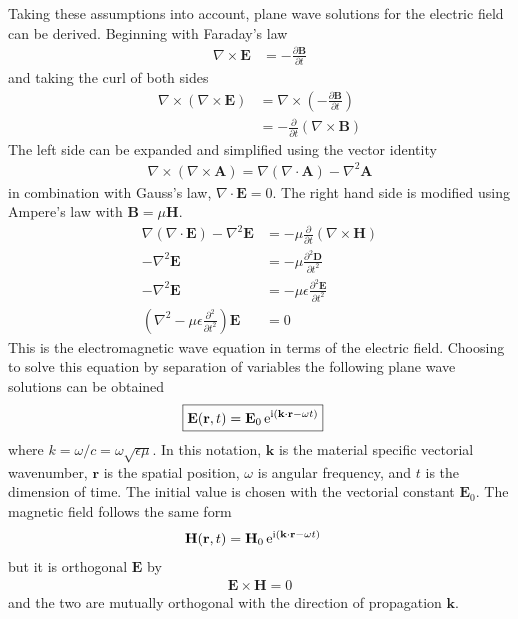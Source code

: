 Taking these assumptions into account, plane wave solutions for the
electric field can be derived. Beginning with Faraday's law
\begin{align}
\nabla \times \mathbf{E} &= -\frac{\partial \mathbf{B}} {\partial t}
\end{align}
and taking the curl of both sides
\begin{align}
\nabla \times
\left(\nabla\times\mathbf{E}\right)&=\nabla\times\left(-\frac{\partial\mathbf{B}}{\partial
t}\right)\\
&=-\frac{\partial}{\partial t}\left(\nabla \times \mathbf{B}\right)
\end{align}
The left side can be expanded and simplified using the vector identity
\begin{align}
\nabla \times \left( \nabla \times \mathbf{A} \right) = \nabla \left(
\nabla \cdot \mathbf{A} \right) - \nabla^2 \mathbf{A}
\end{align}
in combination with Gauss's law, $\nabla \cdot \mathbf{E}=0$.
The right hand side is modified using Ampere's law with $\mathbf{B} =\mu
\mathbf{H}$.
\begin{align}
\nabla\left(\nabla\cdot\mathbf{E}\right)-\nabla^2\mathbf{E}
&=-\mu\frac{\partial}{\partial t}\left(\nabla \times \mathbf{H}\right)\\
-\nabla^2\mathbf{E}&=-\mu\frac{\partial^2 \mathbf{D}}{\partial t^2}\\
-\nabla^2\mathbf{E}&=-\mu\epsilon\frac{\partial^2 \mathbf{E}}{\partial t^2}\\
\left(\nabla^2-\mu\epsilon\frac{\partial^2}{\partial t^2}\right)\mathbf{E}&=0
\label{eqn:ewe}
\end{align}
This is the electromagnetic wave equation in terms of the electric field.
Choosing to solve this equation by separation of variables the following
plane wave solutions can be obtained
\begin{align}
\Aboxed{
 \mathbf{E} ( \mathbf{r}, t ) &= \mathbf{E}_0\, \me^{\mi (\mathbf{k}
 \cdot \mathbf{r} - \omega t )}
}
\label{eqn:planewaves}
\end{align}
where $k=\omega/c=\omega\sqrt{\epsilon\mu}$.  In this notation,
$\mathbf{k}$ is the material specific vectorial wavenumber, $\mathbf{r}$ is the
spatial position, $\omega$ is angular frequency, and $t$ is
the dimension of time.
The initial value is chosen with the vectorial constant $\mathbf{E}_0$.
The magnetic field follows the same form
\begin{align}
 \mathbf{H} ( \mathbf{r}, t ) &= \mathbf{H}_0\, {\mathrm{e}}^{{\mathrm{i}} (\mathbf{k}
 \cdot \mathbf{r} - \omega t )}
\end{align}
but it is orthogonal $\mathbf{E}$ by 
\begin{align}
\mathbf{E} \times \mathbf{H} = 0
\end{align}
and the two are mutually orthogonal with the direction of propagation
$\mathbf{k}$.
